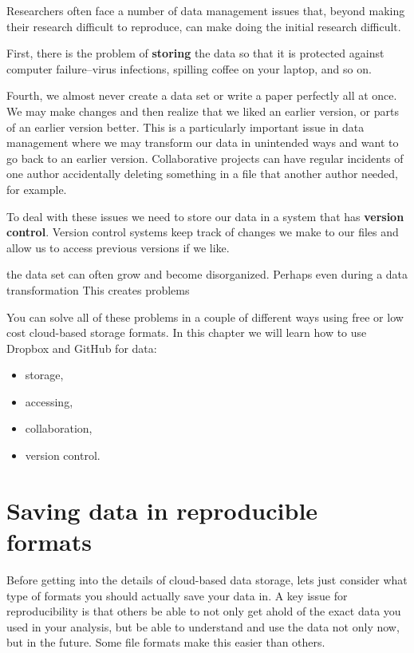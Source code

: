 \documentclass[ChapterTOCs,krantz1]{krantz}\usepackage{graphicx, color}
\begin{document}
Researchers often face a number of data management issues that, beyond
making their research difficult to reproduce, can make doing the initial
research difficult.

First, there is the problem of \textbf{storing} the data so that it is
protected against computer failure--virus infections, spilling coffee on
your laptop, and so on.

Fourth, we almost never create a data set or write a paper perfectly all
at once. We may make changes and then realize that we liked an earlier
version, or parts of an earlier version better. This is a particularly
important issue in data management where we may transform our data in
unintended ways and want to go back to an earlier version. Collaborative
projects can have regular incidents of one author accidentally deleting
something in a file that another author needed, for example.

To deal with these issues we need to store our data in a system that has
\textbf{version control}. Version control systems keep track of changes
we make to our files and allow us to access previous versions if we
like.

the data set can often grow and become disorganized. Perhaps even during
a data transformation This creates problems

You can solve all of these problems in a couple of different ways using
free or low cost cloud-based storage formats. In this chapter we will
learn how to use Dropbox and GitHub for data:

\begin{itemize}
    \item storage,
    \item accessing,
    \item collaboration,
    \item version control.
\end{itemize}

\section{Saving data in reproducible formats}

Before getting into the details of cloud-based data storage, lets just
consider what type of formats you should actually save your data in. A
key issue for reproducibility is that others be able to not only get
ahold of the exact data you used in your analysis, but be able to
understand and use the data not only now, but in the future. Some file
formats make this easier than others.
\end{document}
